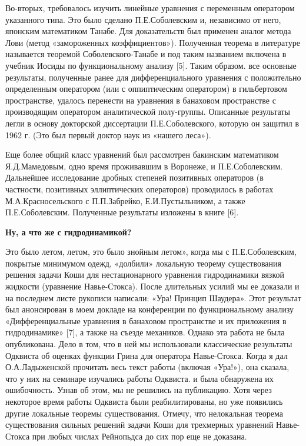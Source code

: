 Во-вторых, требовалось изучить линейные уравнения с переменным оператором указанного типа. Это было сделано П.Е.Соболевским и, независимо от него, японским математиком Танабе. Для доказательств был применен аналог метода Лови (метод «замороженных коэффициентов»). Полученная теорема в литературе называется теоремой Соболевского-Танабе и под таким названием
включена в учебник Иосиды по функциональному анализу [5]. Таким образом. все основные результаты, полученные ранее для дифференциального уравнения с положительно определенным оператором (или с оппиптическим оператором) в гильбертовом пространстве, удалось перенести на уравнения в банаховом пространстве с производящим оператором аналитической полу-группы. Описанные результаты легли в основу докторской диссертации П.Е.Соболевского, которую он защитил в 1962 г. (Это был первый доктор наук из «нашего леса»).

Еще более общий класс уравнений был рассмотрен бакинским математиком Я.Д.Мамедовым, одно время проживавшим в Воронеже, и П.Е.Соболевским. Дальнейшее исследование дробных степеней позитивных операторов (в частности, позитивных эллиптических операторов) проводилось в работах М.А.Красносельского с П.П.Забрейко, Е.И.Пустыльником, а также П.Е.Соболевским. Полученные результаты изложены в книге [6].

{\bf Ну, а что же с гидродинамикой?}

Это было летом, летом, это было знойным летом», когда мы с П.Е.Соболевским, покрытые минимумом одежд, «долбили» локальную теорему существования решения задачи Коши для нестационарного уравнения гидродинамики вязкой жидкости (уравнение Навье-Стокса). После длительных усилий мы ее доказали и на последнем листе рукописи написали: «Ура! Принцип Шаудера». Этот результат был анонсирован в моем докладе на конференции по функциональному анализу «Дифференциальные уравнения в банаховом пространстве и их приложения в гидродинамике» [7], а также на съезде механиков. Однако эта работа не была опубликована. Дело в том, что в ней мы использовали классические результаты Одквиста об оценках функции Грина для оператора Навье-Стокса. Когда я дал О.А.Ладыженской прочитать весь текст работы (включая «Ура!»), она сказала, что у них на семинаре изучались работы Одквиста. и была обнаружена их ошибочность. Узнав об этом, мы не решились на публикацию. Хотя через некоторое время работы Одквиста были реабилитированы, но уже появились другие локальные теоремы существования. Отмечу, что нелокальная теорема существования сильных решений задачи Коши для трехмерных уравнений Навье-Стокса при любых числах Рейнопьдса до сих пор еще не доказана.

